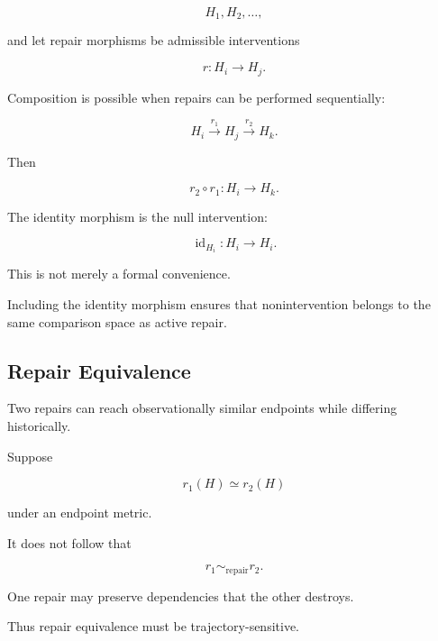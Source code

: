 \documentclass[11pt]{article}
\theoremstyle{remark}
\begin{document}
\begin{equation}
H_1,H_2,\ldots,
\end{equation}

and let repair morphisms be admissible interventions

\begin{equation}
r:H_i\rightarrow H_j.
\end{equation}

Composition is possible when repairs can be performed sequentially:

\begin{equation}
H_i
\xrightarrow{r_1}
H_j
\xrightarrow{r_2}
H_k.
\end{equation}

Then

\begin{equation}
r_2\circ r_1
:
H_i\rightarrow H_k.
\end{equation}

The identity morphism is the null intervention:

\begin{equation}
\operatorname{id}_{H_i}:H_i\rightarrow H_i.
\end{equation}

This is not merely a formal convenience.

Including the identity morphism ensures that nonintervention belongs to the same comparison space as active repair.

\subsection{Repair Equivalence}

Two repairs can reach observationally similar endpoints while differing historically.

Suppose

\begin{equation}
r_1(H)
\simeq
r_2(H)
\end{equation}

under an endpoint metric.

It does not follow that

\begin{equation}
r_1\sim_{\mathrm{repair}}r_2.
\end{equation}

One repair may preserve dependencies that the other destroys.

Thus repair equivalence must be trajectory-sensitive.
\end{document}
